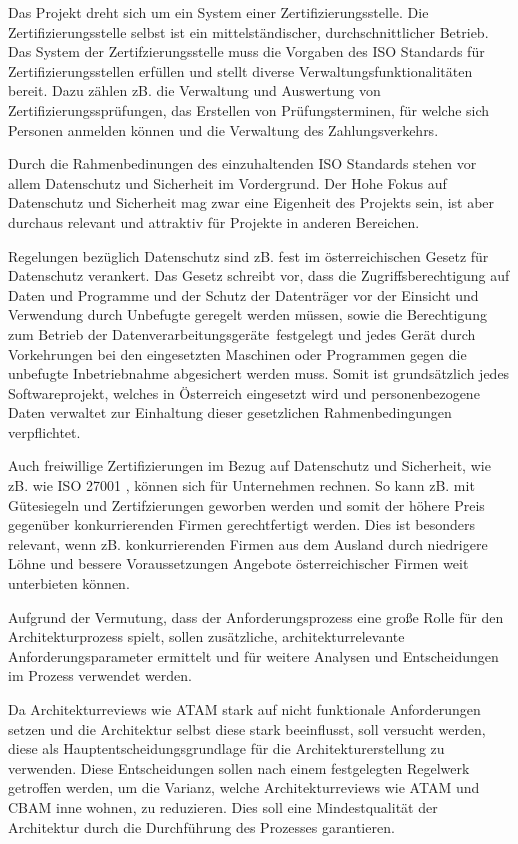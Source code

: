 Das Projekt dreht sich um ein System einer Zertifizierungsstelle. Die Zertifizierungsstelle selbst ist ein mittelständischer, durchschnittlicher Betrieb. Das System der Zertifzierungsstelle muss die Vorgaben des ISO Standards für Zertifizierungsstellen erfüllen\cite{ISO_CERT} und stellt diverse Verwaltungsfunktionalitäten bereit. Dazu zählen zB. die Verwaltung und Auswertung von Zertifizierungssprüfungen, das Erstellen von Prüfungsterminen, für welche sich Personen anmelden können und die Verwaltung des Zahlungsverkehrs.

Durch die Rahmenbedinungen des einzuhaltenden ISO Standards stehen vor allem Datenschutz und Sicherheit im Vordergrund. Der Hohe Fokus auf Datenschutz und Sicherheit mag zwar eine Eigenheit des Projekts sein, ist aber durchaus relevant und attraktiv für Projekte in anderen Bereichen.

Regelungen bezüglich Datenschutz sind zB. fest im österreichischen Gesetz für Datenschutz verankert. Das Gesetz schreibt vor, dass \glqq die Zugriffsberechtigung auf Daten und Programme und der Schutz der Datenträger vor der Einsicht und Verwendung durch Unbefugte\grqq \cite[§ 14, 5]{datenschutz} geregelt werden müssen, sowie \glqq die Berechtigung zum Betrieb der Datenverarbeitungsgeräte\grqq \ festgelegt \glqq und jedes Gerät durch Vorkehrungen bei den eingesetzten Maschinen oder Programmen gegen die unbefugte Inbetriebnahme\grqq \cite[§ 14, 6]{datenschutz} abgesichert werden muss. Somit ist grundsätzlich jedes Softwareprojekt, welches in Österreich eingesetzt wird und personenbezogene Daten verwaltet zur Einhaltung dieser gesetzlichen Rahmenbedingungen verpflichtet.

Auch freiwillige Zertifizierungen im Bezug auf Datenschutz und Sicherheit, wie zB. wie ISO 27001 \cite{ISO_SEC}, können sich für Unternehmen rechnen. So kann zB. mit Gütesiegeln und Zertifzierungen geworben werden und somit der höhere Preis gegenüber konkurrierenden Firmen gerechtfertigt werden. Dies ist besonders relevant, wenn zB. konkurrierenden Firmen aus dem Ausland durch niedrigere Löhne und bessere Voraussetzungen Angebote österreichischer Firmen weit unterbieten können.

Aufgrund der Vermutung, dass der Anforderungsprozess eine große Rolle für den Architekturprozess spielt, sollen zusätzliche, architekturrelevante Anforderungsparameter ermittelt und für weitere Analysen und Entscheidungen im Prozess verwendet werden.

Da Architekturreviews wie ATAM stark auf nicht funktionale Anforderungen setzen und die Architektur selbst diese stark beeinflusst, soll versucht werden, diese als Hauptentscheidungsgrundlage für die Architekturerstellung zu verwenden. Diese Entscheidungen sollen nach einem festgelegten Regelwerk getroffen werden, um die Varianz, welche Architekturreviews wie ATAM und CBAM inne wohnen, zu reduzieren. Dies soll eine Mindestqualität der Architektur durch die Durchführung des Prozesses garantieren.

